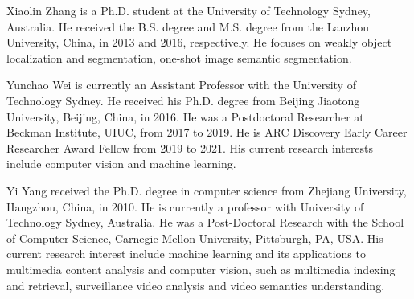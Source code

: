 \documentclass[journal]{IEEEtran}
\begin{document}





\vspace{-40pt}
\begin{IEEEbiography}{Xiaolin Zhang}
is a Ph.D. student at the University of Technology Sydney, Australia. 
He received the B.S. degree and M.S. degree from the Lanzhou University, China, in 2013 and 2016, respectively.
He focuses on weakly object localization and segmentation, one-shot image semantic segmentation.
\end{IEEEbiography}
\vspace{-40pt}

\begin{IEEEbiography}
{Yunchao Wei}
is currently an Assistant Professor with the University of Technology Sydney. He received his Ph.D. degree from Beijing Jiaotong University, Beijing, China, in 2016. He was a Postdoctoral Researcher at Beckman Institute, UIUC, from 2017 to 2019. He is ARC Discovery Early Career Researcher Award Fellow from 2019 to 2021. His current research interests include computer vision and machine learning.
\end{IEEEbiography}
\vspace{-40pt}

\begin{IEEEbiography}{Yi Yang}
received the Ph.D. degree in computer science from Zhejiang University, Hangzhou, China, in 2010. He is currently a professor with University of Technology Sydney, Australia. He was a Post-Doctoral Research with the School of Computer Science, Carnegie Mellon University, Pittsburgh, PA, USA. His current research interest include machine learning and its applications to multimedia content analysis and computer vision, such as multimedia indexing and retrieval, surveillance video analysis and video semantics understanding.
\end{IEEEbiography}
\vspace{-40pt}
\end{document}
